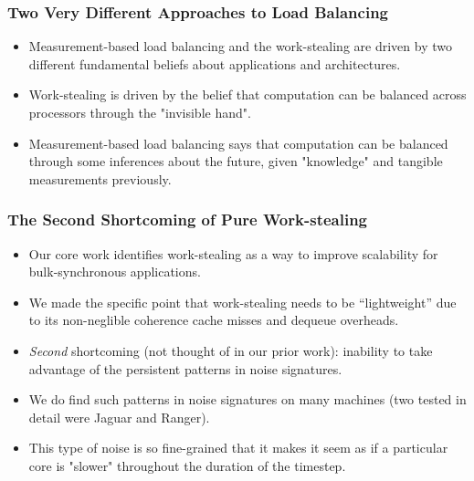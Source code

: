 \begin{frame} 
\frametitle{Two Very Different Approaches to Load Balancing} 
\begin{itemize}
\item Measurement-based load balancing and the work-stealing 
are driven by two different fundamental beliefs about applications and
architectures. 
\item Work-stealing is driven by the belief that computation can be
balanced across processors through the "invisible hand". 
\item Measurement-based load balancing says that computation can be 
balanced through some inferences about the future, given "knowledge" 
and tangible measurements previously. 

\end{itemize} 
\end{frame}  


\begin{frame} 
\frametitle{The Second Shortcoming of Pure Work-stealing}
\begin{itemize}
\item \small Our core work identifies work-stealing as a way to
improve scalability for bulk-synchronous applications. 

\item \small We made the specific point that work-stealing
needs to be ``lightweight'' due to its non-neglible coherence cache
misses and dequeue overheads. \\

\item \small \textit{Second} shortcoming (not thought of in our
prior work): inability to take advantage of the persistent patterns in
noise signatures. \\

\item \small We do find such patterns in noise signatures on many machines 
(two tested in detail were Jaguar and Ranger). \\

\item \small This type of noise is so fine-grained that it makes
it seem as if a particular core is "slower" throughout the duration of 
the timestep. 
\end{itemize}
\end{frame} 

